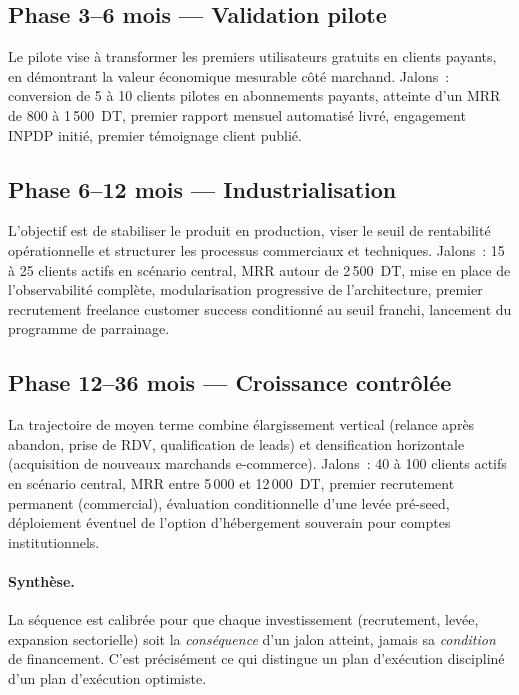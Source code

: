 \subsection{Phase 3--6 mois — Validation pilote}
\label{subsec:phase_3_6}

Le pilote vise à transformer les premiers utilisateurs gratuits en clients payants, en démontrant la valeur économique mesurable côté marchand. Jalons~: conversion de 5 à 10 clients pilotes en abonnements payants, atteinte d'un MRR de 800 à 1\,500~DT, premier rapport mensuel automatisé livré, engagement INPDP initié, premier témoignage client publié.

\subsection{Phase 6--12 mois — Industrialisation}
\label{subsec:phase_6_12}

L'objectif est de stabiliser le produit en production, viser le seuil de rentabilité opérationnelle et structurer les processus commerciaux et techniques. Jalons~: 15 à 25 clients actifs en scénario central, MRR autour de 2\,500~DT, mise en place de l'observabilité complète, modularisation progressive de l'architecture, premier recrutement freelance customer success conditionné au seuil franchi, lancement du programme de parrainage.

\subsection{Phase 12--36 mois — Croissance contrôlée}
\label{subsec:phase_12_36}

La trajectoire de moyen terme combine élargissement vertical (relance après abandon, prise de RDV, qualification de leads) et densification horizontale (acquisition de nouveaux marchands e-commerce). Jalons~: 40 à 100 clients actifs en scénario central, MRR entre 5\,000 et 12\,000~DT, premier recrutement permanent (commercial), évaluation conditionnelle d'une levée pré-seed, déploiement éventuel de l'option d'hébergement souverain pour comptes institutionnels.

\paragraph{Synthèse.} La séquence est calibrée pour que chaque investissement (recrutement, levée, expansion sectorielle) soit la \emph{conséquence} d'un jalon atteint, jamais sa \emph{condition} de financement. C'est précisément ce qui distingue un plan d'exécution discipliné d'un plan d'exécution optimiste.

